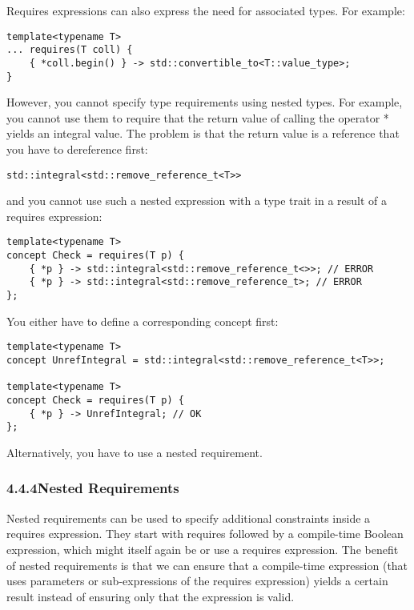 Requires expressions can also express the need for associated types. For example:

\begin{lstlisting}[style=styleCXX]
template<typename T>
... requires(T coll) {
	{ *coll.begin() } -> std::convertible_to<T::value_type>;
}
\end{lstlisting}

However, you cannot specify type requirements using nested types. For example, you cannot use them to require that the return value of calling the operator * yields an integral value. The problem is that the return value is a reference that you have to dereference first:

\begin{lstlisting}[style=styleCXX]
std::integral<std::remove_reference_t<T>>
\end{lstlisting}

and you cannot use such a nested expression with a type trait in a result of a requires expression:

\begin{lstlisting}[style=styleCXX]
template<typename T>
concept Check = requires(T p) {
	{ *p } -> std::integral<std::remove_reference_t<>>; // ERROR
	{ *p } -> std::integral<std::remove_reference_t>; // ERROR
};
\end{lstlisting}

You either have to define a corresponding concept first:

\begin{lstlisting}[style=styleCXX]
template<typename T>
concept UnrefIntegral = std::integral<std::remove_reference_t<T>>;

template<typename T>
concept Check = requires(T p) {
	{ *p } -> UnrefIntegral; // OK
};
\end{lstlisting}

Alternatively, you have to use a nested requirement.

\subsubsection*{ 4.4.4\hspace{0.2cm}Nested Requirements}

Nested requirements can be used to specify additional constraints inside a requires expression. They start with requires followed by a compile-time Boolean expression, which might itself again be or use a requires expression. The benefit of nested requirements is that we can ensure that a compile-time expression (that uses parameters or sub-expressions of the requires expression) yields a certain result instead of ensuring only that the expression is valid.

